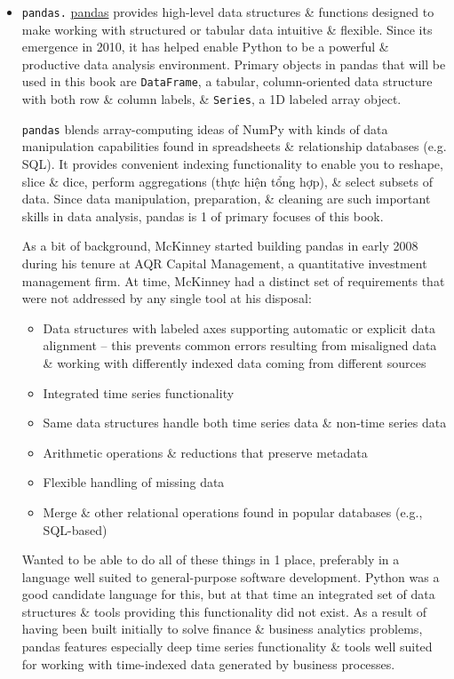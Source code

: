 \documentclass{article}
\begin{document}
\begin{enumerate}
\begin{itemize}
\begin{itemize}
\begin{itemize}
				\item {\tt pandas.} \href{https://pandas.pydata.org}{pandas} provides high-level data structures \& functions designed to make working with structured or tabular data intuitive \& flexible. Since its emergence in 2010, it has helped enable Python to be a powerful \& productive data analysis environment. Primary objects in pandas that will be used in this book are {\tt DataFrame}, a tabular, column-oriented data structure with both row \& column labels, \& {\tt Series}, a 1D labeled array object.
				
				{\tt pandas} blends array-computing ideas of NumPy with kinds of data manipulation capabilities found in spreadsheets \& relationship databases (e.g. SQL). It provides convenient indexing functionality to enable you to reshape, slice \& dice, perform aggregations (thực hiện tổng hợp), \& select subsets of data. Since data manipulation, preparation, \& cleaning are such important skills in data analysis, pandas is 1 of primary focuses of this book.
				
				As a bit of background, {\sc McKinney} started building pandas in early 2008 during his tenure at AQR Capital Management, a quantitative investment management firm. At time, {\sc McKinney} had a distinct set of requirements that were not addressed by any single tool at his disposal:
				\begin{itemize}
					\item Data structures with labeled axes supporting automatic or explicit data alignment -- this prevents common errors resulting from misaligned data \& working with differently indexed data coming from different sources
					\item Integrated time series functionality
					\item Same data structures handle both time series data \& non-time series data
					\item Arithmetic operations \& reductions that preserve metadata
					\item Flexible handling of missing data
					\item Merge \& other relational operations found in popular databases (e.g., SQL-based)
				\end{itemize}
				Wanted to be able to do all of these things in 1 place, preferably in a language well suited to general-purpose software development. Python was a good candidate language for this, but at that time an integrated set of data structures \& tools providing this functionality did not exist. As a result of having been built initially to solve finance \& business analytics problems, pandas features especially deep time series functionality \& tools well suited for working with time-indexed data generated by business processes.
				

\end{itemize}
\end{itemize}
\end{itemize}
\end{enumerate}
\end{document}
